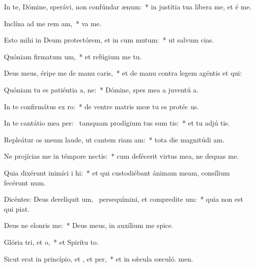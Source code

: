 \item In te, Dómine, sperávi, non confúndar  ænum:~* in justítia tua líbera me, et é me.
\item Inclína ad me rem am,~*  va me.
\item Esto mihi in Deum protectórem, et in cum mutum:~* ut salvum  cias.
\item Quóniam firmatum um,~* et refúgium me  tu.
\item Deus meus, éripe me de manu caris,~* et de manu contra legem agéntis et qui:
\item Quóniam tu es patiéntia a, ne:~* Dómine, spes mea a juventú a.
\item In te confirmátus  ex ro:~* de ventre matris meæ tu es protéc us.
\item In te cantátio mea per:~\pscross{} tamquam prodígium tus sum tis:~* et tu adjú tis.
\item Repleátur os meum laude, ut cantem riam am:~* tota die magnitúdi am.
\item Ne projícias me in témpore nectis:~* cum defécerit virtus mea, ne dequas me.
\item Quia dixérunt inimíci i hi:~* et qui custodiébant ánimam meam, consílium fecérunt  num.
\item Dicéntes: Deus derelíquit um,~\pscross{} persequímini, et compredite um:~* quia non est qui piat.
\item Deus ne elonris  me:~* Deus meus, in auxílium me spice.
\item Glória tri, et o,~* et Spirítu to.
\item Sicut erat in princípio, et , et per,~* et in sǽcula sæculó. men.
